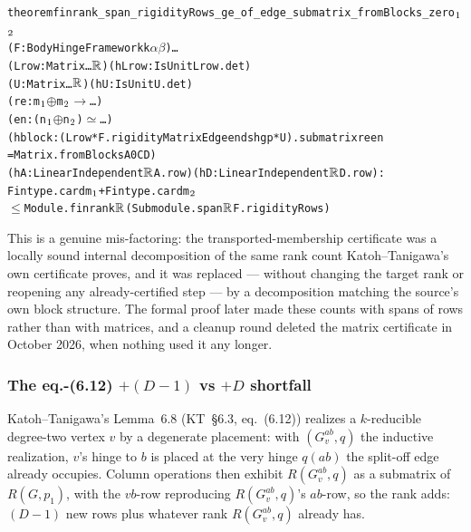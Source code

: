 \begin{alltt}
theorem finrank_span_rigidityRows_ge_of_edge_submatrix_fromBlocks_zero\(\sb{1}\)\(\sb{2}\)
    (F : BodyHingeFramework k \(\alpha\) \(\beta\)) \dots
    (Lrow : Matrix \dots \(\R\)) (hLrow : IsUnit Lrow.det)
    (U : Matrix \dots \(\R\)) (hU : IsUnit U.det)
    (re : m\(\sb{1}\) \(\oplus\) m\(\sb{2}\) \(\to\) \dots)
    (en : (n\(\sb{1}\) \(\oplus\) n\(\sb{2}\)) \(\simeq\) \dots)
    (hblock : (Lrow * F.rigidityMatrixEdge ends hgp * U).submatrix re en
      = Matrix.fromBlocks A 0 C D)
    (hA : LinearIndependent \(\R\) A.row) (hD : LinearIndependent \(\R\) D.row) :
    Fintype.card m\(\sb{1}\) + Fintype.card m\(\sb{2}\)
      \(\le\) Module.finrank \(\R\) (Submodule.span \(\R\) F.rigidityRows)
\end{alltt}

This is a genuine mis-factoring: the transported-membership certificate was
a locally sound internal decomposition of the same rank count
Katoh--Tanigawa's own certificate proves, and it was replaced --- without
changing the target rank or reopening any already-certified step --- by a
decomposition matching the source's own block structure. The formal proof
later made these counts with spans of rows rather than with matrices, and a
cleanup round deleted the matrix certificate in October 2026, when nothing
used it any longer.

\subsubsection{The eq.-(6.12) \texorpdfstring{$+(D-1)$}{+(D-1)} vs \texorpdfstring{$+D$}{+D} shortfall}

Katoh--Tanigawa's Lemma~6.8 (KT~\S6.3, eq.~(6.12)) realizes a $k$-reducible
degree-two vertex $v$ by a degenerate placement: with $(G_v^{ab}, q)$ the
inductive realization, $v$'s hinge to $b$ is placed at the very hinge
$q(ab)$ the split-off edge already occupies. Column operations then exhibit
$R(G_v^{ab}, q)$ as a submatrix of $R(G, p_1)$, with the $vb$-row
reproducing $R(G_v^{ab}, q)$'s $ab$-row, so the rank adds: $(D-1)$ new rows
plus whatever rank $R(G_v^{ab}, q)$ already has.

